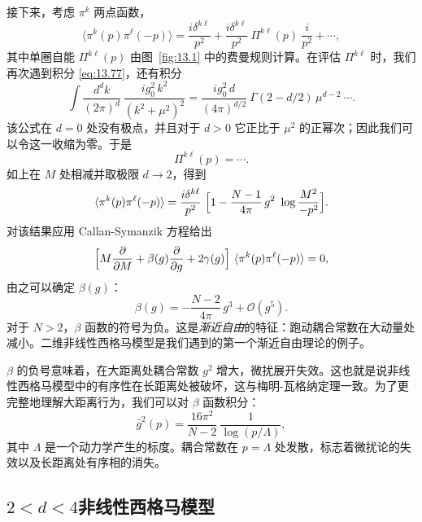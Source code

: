 接下来，考虑 $\pi^k$ 两点函数，
\begin{equation}
  \langle\pi^k(p)\pi^\ell(-p)\rangle = \frac{i\delta^{k\ell}}{p^2}
    + \frac{i\delta^{k\ell}}{p^2}\ \Pi^{k\ell}(p)\ \frac{i}{p^2} + \cdots ,
  \label{eq:13.81}
\end{equation}
其中单圈自能 $\Pi^{k\ell}(p)$ 由图~\ref{fig:13.1} 中的费曼规则计算。在评估 $\Pi^{k\ell}$ 时，我们再次遇到积分 \eqref{eq:13.77}，还有积分
\begin{equation}
  \int \frac{d^dk}{(2\pi)^d}\ \frac{i g_0^2\,k^2}{(k^2+\mu^2)^2}
  = \frac{i g_0^2\,d}{(4\pi)^{d/2}}\ \Gamma(2-d/2)\,\mu^{d-2}\ \cdots .
  \label{eq:13.82}
\end{equation}
该公式在 $d = 0$ 处没有极点，并且对于 $d > 0$ 它正比于 $\mu^2$ 的正幂次；因此我们可以令这一收缩为零。于是
\begin{equation}
  \Pi^{k\ell}(p) = \cdots .
  \label{eq:13.83}
\end{equation}
如上在 $M$ 处相减并取极限 $d\to 2$，得到
\begin{equation}
  \langle\pi^k(p)\pi^\ell(-p)\rangle = \frac{i\delta^{k\ell}}{p^2}\ \Bigl[
    1 - \frac{N-1}{4\pi}\,g^2\ \log\frac{M^2}{-p^2} \Bigr] .
  \label{eq:13.84}
\end{equation}
对该结果应用 Callan-Symanzik 方程给出
\begin{equation}
  \Bigl[ M\frac{\partial}{\partial M} + \beta(g)\frac{\partial}{\partial g}
    + 2\gamma(g) \Bigr]\ \langle\pi^k(p)\pi^\ell(-p)\rangle = 0 ,
\end{equation}
由之可以确定 $\beta(g)$：
\begin{equation}
  \beta(g) = -\frac{N-2}{4\pi}\,g^3 + \mathcal{O}(g^5) .
  \label{eq:13.86}
\end{equation}
对于 $N > 2$，$\beta$ 函数的符号为负。这是\emph{渐近自由}的特征：跑动耦合常数在大动量处减小。二维非线性西格马模型是我们遇到的第一个渐近自由理论的例子。

$\beta$ 的负号意味着，在大距离处耦合常数 $g^2$ 增大，微扰展开失效。这也就是说非线性西格马模型中的有序性在长距离处被破坏，这与梅明-瓦格纳定理一致。为了更完整地理解大距离行为，我们可以对 $\beta$ 函数积分：
\begin{equation}
  \bar{g}^2(p) = \frac{16\pi^2}{N-2}\ \frac{1}{\log(p/\Lambda)} ,
  \label{eq:13.87}
\end{equation}
其中 $\Lambda$ 是一个动力学产生的标度。耦合常数在 $p = \Lambda$ 处发散，标志着微扰论的失效以及长距离处有序相的消失。

\subsection{$2 < d < 4$非线性西格马模型}


